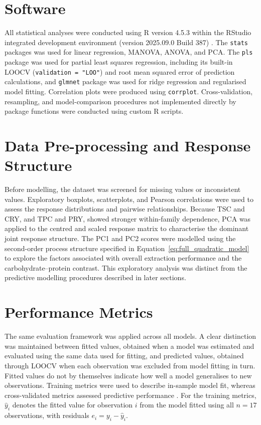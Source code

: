 \documentclass[MScDSA]{uccthesis}
\begin{document}
\section{Software}
\label{sec:software}
All statistical analyses were conducted using R version 4.5.3 \parencite{RCoreTeam:2026} within the RStudio integrated development environment (version 2025.09.0 Build 387) \parencite{RStudio:2025}. The \texttt{stats} packages was used for linear regression, MANOVA, ANOVA, and PCA. The \texttt{pls} package was used for partial least squares regression, including its built-in LOOCV (\texttt{validation = "LOO"}) and root mean squared error of prediction calculations, and \texttt{glmnet} package was used for ridge regression and regularised model fitting. Correlation plots were produced using \texttt{corrplot}. Cross-validation, resampling, and model-comparison procedures not implemented directly by package functions were conducted using custom R scripts.

\section{Data Pre-processing and Response Structure}
\label{sec:exploratory_data_analysis}
Before modelling, the dataset was screened for missing values or inconsistent values. Exploratory boxplots, scatterplots, and Pearson correlations \parencite{Schober:2018} were used to assess the response distributions and pairwise relationships. Because TSC and CRY, and TPC and PRY, showed stronger within-family dependence, PCA \parencite{Jolliffe:2002} was applied to the centred and scaled response matrix to characterise the dominant joint response structure. The PC1 and PC2 scores were modelled using the second-order process structure specified in Equation~\ref{eq:full_quadratic_model} to explore the factors associated with overall extraction performance and the carbohydrate--protein contrast. This exploratory analysis was distinct from the predictive modelling procedures described in later sections.

\section{Performance Metrics}
\label{sec:performance_metrics}
The same evaluation framework was applied across all models. A clear distinction was maintained between fitted values, obtained when a model was estimated and evaluated using the same data used for fitting, and predicted values, obtained through LOOCV when each observation was excluded from model fitting in turn. Fitted values do not by themselves indicate how well a model generalises to new observations. Training metrics were used to describe in-sample model fit, whereas cross-validated metrics assessed predictive performance \parencite{NIST:2012}. For the training metrics, $\hat{y}_i$ denotes the fitted value for observation $i$ from the model fitted using all $n=17$ observations, with residuals $e_i=y_i-\hat{y}_i$.
\end{document}
